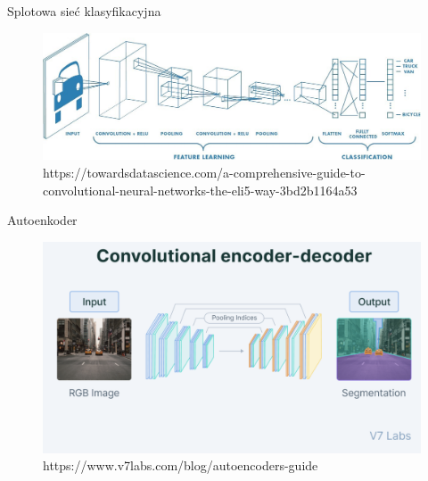 \documentclass[10pt]{beamer}
\begin{document}
    \begin{frame}{Splotowa sieć klasyfikacyjna}
        \begin{figure}
            \includegraphics[width=\textwidth]{images/classification.jpeg}
            \caption{https://towardsdatascience.com/a-comprehensive-guide-to-convolutional-neural-networks-the-eli5-way-3bd2b1164a53}
        \end{figure}
        
    \end{frame}

    \begin{frame}{Autoenkoder}
        \begin{figure}
            \includegraphics[width=\textwidth]{images/autoencoder.png}
            \caption{https://www.v7labs.com/blog/autoencoders-guide}
        \end{figure}
        
    \end{frame}
\end{document}
